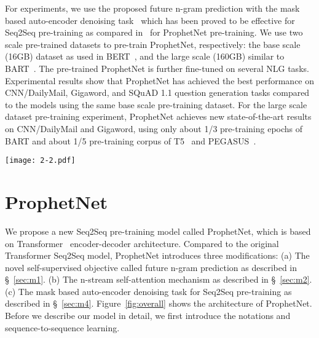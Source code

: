 \documentclass[11pt,a4paper]{article}
\begin{document}
For experiments, we use the proposed future n-gram prediction with the mask based auto-encoder denoising task~\cite{song2019mass,lewis2019bart} which has been proved to be effective for Seq2Seq pre-training as compared in~\citet{raffel2019exploring} for ProphetNet pre-training.  
We use two scale pre-trained datasets to pre-train ProphetNet, respectively: the base scale (16GB) dataset as used in BERT~\cite{devlin2018bert}, and the large scale (160GB) similar to BART~\cite{lewis2019bart}. 
The pre-trained ProphetNet is further fine-tuned on several NLG tasks.
Experimental results show that ProphetNet has achieved the best performance on CNN/DailyMail, Gigaword, and SQuAD 1.1 question generation tasks compared to the models using the same base scale pre-training dataset. 
For the large scale dataset pre-training experiment, ProphetNet achieves new state-of-the-art results on CNN/DailyMail and Gigaword, using only about 1/3 pre-training epochs of BART and about 1/5 pre-training corpus of T5~\cite{raffel2019exploring} and PEGASUS~\cite{zhang2019pegasus}.

\begin{figure*}[th]
    \centering
	\texttt{[image: 2-2.pdf]}
	\caption{The architecture of ProphetNet. For simplicity, we take bigram () as an example to introduce ProphetNet, whose modeling target is  for each time step. The left part shows the encoder of the ProphetNet which is the same as the original Transformer encoder. The right part presents the decoder of the ProphetNet which incorporates the proposed n-stream self-attention.
	For Seq2Seq pre-training, we present the example of inputs and outputs of the mask based auto-encoder denoising task. The token ``\_'' represents the mask symbol []. Note that each  and  are the same in this task. The layer normalization and residual connection are ignored.}\label{fig:overall}
\end{figure*}

\section{ProphetNet}
We propose a new Seq2Seq pre-training model called ProphetNet, which is based on Transformer~\cite{vaswani2017attention} encoder-decoder architecture. Compared to the original Transformer Seq2Seq model, ProphetNet introduces three modifications: 
(a) The novel self-supervised objective called future n-gram prediction as described in \S~\ref{sec:m1}. 
(b) The n-stream self-attention mechanism as described in \S~\ref{sec:m2}.
(c) The mask based auto-encoder denoising task for Seq2Seq pre-training as described in \S~\ref{sec:m4}.
Figure~\ref{fig:overall} shows the architecture of ProphetNet.
Before we describe our model in detail, we first introduce the notations and sequence-to-sequence learning. 
 
\end{document}
